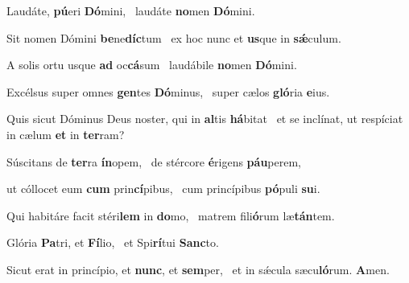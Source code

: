 \item Laudáte, \textbf{pú}eri \textbf{Dó}mini,~\psstar{} laudáte \textbf{no}men \textbf{Dó}mini.

\item Sit nomen Dómini \textbf{be}ne\textbf{díc}tum~\psstar{} ex hoc nunc et \textbf{us}que in \textbf{sǽ}culum.

\item A solis ortu usque \textbf{ad} oc\textbf{cá}sum~\psstar{} laudábile \textbf{no}men \textbf{Dó}mini.

\item Excélsus super omnes \textbf{gen}tes \textbf{Dó}minus,~\psstar{} super cælos \textbf{gló}ria \textbf{e}ius.

\item Quis sicut Dóminus Deus noster, qui in \textbf{al}tis \textbf{há}bitat~\psstar{} et se inclínat, ut respíciat in cælum \textbf{et} in \textbf{ter}ram?

\item Súscitans de \textbf{ter}ra \textbf{ín}opem,~\psstar{} de stércore \textbf{é}rigens \textbf{páu}perem,

\item ut cóllocet eum \textbf{cum} prin\textbf{cí}pibus,~\psstar{} cum princípibus \textbf{pó}puli \textbf{su}i.

\item Qui habitáre facit stéri\textbf{lem} in \textbf{do}mo,~\psstar{} matrem fili\textbf{ó}rum læ\textbf{tán}tem.

\item Glória \textbf{Pa}tri, et \textbf{Fí}lio,~\psstar{} et Spi\textbf{rí}tui \textbf{Sanc}to.

\item Sicut erat in princípio, et \textbf{nunc}, et \textbf{sem}per,~\psstar{} et in sǽcula sæcu\textbf{ló}rum. \textbf{A}men.